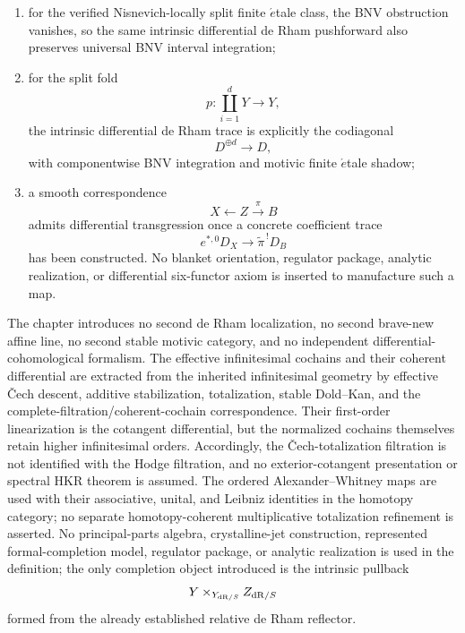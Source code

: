 \begin{theorem}
\begin{enumerate}
\item for the verified Nisnevich-locally split finite
\(\acute{e}\)tale class, the BNV obstruction vanishes, so the same intrinsic
differential de Rham pushforward also preserves universal BNV interval
integration;

\item for the split fold
\[
    p:\coprod_{i=1}^dY\to Y,
\]
the intrinsic differential de Rham trace is explicitly the codiagonal
\[
\boxed{
    D^{\oplus d}\longrightarrow D,
}
\]
with componentwise BNV integration and motivic finite
\(\acute{e}\)tale shadow;

\item a smooth correspondence
\[
    X\longleftarrow Z\xrightarrow{\pi}B
\]
admits differential transgression once a concrete coefficient trace
\[
    e^{*,0}D_X
    \longrightarrow
    \widetilde\pi^{\,!}D_B
\]
has been constructed.  No blanket orientation, regulator package, analytic
realization, or differential six-functor axiom is inserted to manufacture
such a map.
\end{enumerate}

The chapter introduces no second de Rham localization, no second brave-new affine line, no second
stable motivic category, and no independent differential-cohomological formalism.  The effective
infinitesimal cochains and their coherent differential are extracted from the inherited infinitesimal
geometry by effective \v{C}ech descent, additive stabilization, totalization, stable Dold--Kan, and
the complete-filtration/coherent-cochain correspondence.  Their first-order linearization is the
cotangent differential, but the normalized cochains themselves retain higher infinitesimal orders.
Accordingly, the \v{C}ech-totalization filtration is not identified with the Hodge filtration, and no
exterior-cotangent presentation or spectral HKR theorem is assumed.  The ordered Alexander--Whitney
maps are used with their associative, unital, and Leibniz identities in the homotopy category; no
separate homotopy-coherent multiplicative totalization refinement is asserted.  No principal-parts
algebra, crystalline-jet construction, represented formal-completion model, regulator package, or
analytic realization is used in the definition; the only completion object introduced is the
intrinsic pullback
\[
    Y\times_{Y_{\mathrm{dR}/S}}Z_{\mathrm{dR}/S}
\]
formed from the already established relative de Rham reflector.


\end{theorem}
